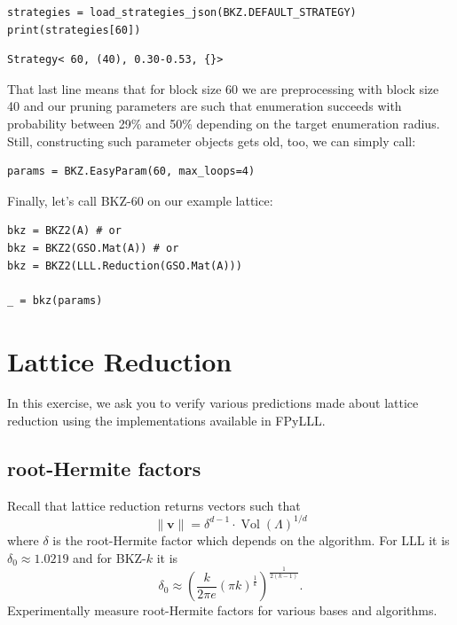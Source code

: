 \documentclass[10pt,a4paper,nobib]{tufte-handout}
\DeclareMathOperator{\Vol}{Vol}
\renewcommand{\vec}[1]{\ensuremath{\mathbf{#1}}\xspace}
\begin{document}
\lstset{language=Python,label= ,caption= ,captionpos=b,numbers=none}
\begin{lstlisting}
strategies = load_strategies_json(BKZ.DEFAULT_STRATEGY)
print(strategies[60])
\end{lstlisting}

\begin{verbatim}
Strategy< 60, (40), 0.30-0.53, {}>
\end{verbatim}


That last line means that for block size 60 we are preprocessing with block size 40 and our pruning parameters are such that enumeration succeeds with probability between 29\% and 50\% depending on the target enumeration radius. Still, constructing such parameter objects gets old, too, we can simply call:
\lstset{language=Python,label= ,caption= ,captionpos=b,numbers=none}
\begin{lstlisting}
params = BKZ.EasyParam(60, max_loops=4)
\end{lstlisting}

Finally, let’s call BKZ-60 on our example lattice:
\lstset{language=Python,label= ,caption= ,captionpos=b,numbers=none}
\begin{lstlisting}
bkz = BKZ2(A) # or
bkz = BKZ2(GSO.Mat(A)) # or 
bkz = BKZ2(LLL.Reduction(GSO.Mat(A)))

_ = bkz(params)
\end{lstlisting}

\section{Lattice Reduction}
\label{sec:org0bdc19b}

In this exercise, we ask you to verify various predictions made about lattice reduction using the implementations available in FPyLLL.

\subsection{root-Hermite factors}
\label{sec:org89f91b1}

Recall that lattice reduction returns vectors such that
\[
\|\vec{v}\| = δ^{d-1} ⋅ \Vol(\Lambda)^{1/d}
\]
where \(\delta\) is the root-Hermite factor which depends on the algorithm. For LLL it  is \(δ_0≈1.0219\) and for BKZ-\(k\) it is \[δ_0 ≈ \left( \frac{k}{2 π e} (π k)^{\frac{1}{k}}  \right)^{\frac{1}{2(k-1)}}.\] Experimentally measure root-Hermite factors for various bases and algorithms.
\end{document}
